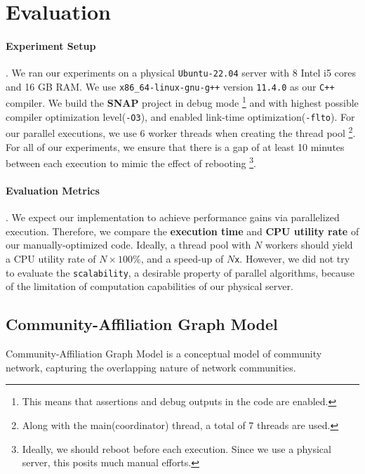 \section{Evaluation}\label{sec:evaluation}

\paragraph{Experiment Setup}. We ran our experiments on a physical
\texttt{Ubuntu-22.04} server with 8 Intel i5 cores and 16 GB RAM. We use 
\texttt{x86\_64-linux-gnu-g++} version \texttt{11.4.0} as our \texttt{C++} compiler.
We build the \textbf{SNAP} project in debug mode
\footnote{This means that assertions and debug outputs in the code are enabled.}
and with highest possible compiler optimization  level(\texttt{-O3}), and 
enabled link-time optimization(\texttt{-flto}).
For our parallel executions, we use $6$ worker threads when creating the thread
pool
\footnote{Along with the main(coordinator) thread, a total of 7 threads 
are used.}. For all of our experiments, we ensure that there is a gap of at
least 10 minutes between each execution to mimic the effect of rebooting
\footnote{Ideally, we should reboot before each execution. Since we use a
physical server, this posits much manual efforts.}.

\paragraph{Evaluation Metrics}. We expect our implementation to achieve 
performance gains via parallelized execution. Therefore, we compare the 
\textbf{execution time} and \textbf{CPU utility rate} of our 
manually-optimized code. Ideally, a thread pool with $N$ workers should yield
a CPU utility rate of $N\times 100\%$, and a speed-up of $N$\texttt{x}. However,
we did not try to evaluate the \texttt{scalability}, a desirable property of 
parallel algorithms, because of the limitation of computation capabilities of
 our physical server.

\subsection{Community-Affiliation Graph Model}\label{sec:evalcd}

\par Community-Affiliation Graph Model\citep{yang2012structure,yang2012community} 
is a conceptual model of community network, capturing the overlapping nature of 
network communities.

